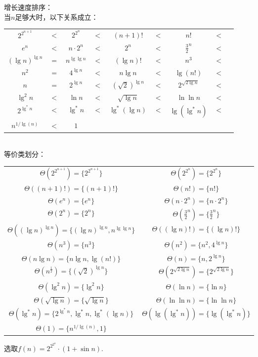 
\begin{solution}
    增长速度排序：\\
    当$n$足够大时，以下关系成立：\\
    \begin{tabular}{ccccccccc}
        $2^{2^{n+1}}$       &$<$& $2^{2^n}$         &$<$& $(n+1)!$              &$<$& $n!$                  &$<$\\
        $e^n$               &$<$& $n \cdot 2^n$     &$<$& $2^n$                 &$<$& $\frac{3}{2}^{n}$     &$<$\\
        $(\lg n)^{\lg n}$   &$=$& $n^{\lg\lg n}$    &$<$& $(\lg n)!$            &$<$& $n^3$                 &$<$\\
        $n^2$               &$=$& $4^{\lg n}$       &$<$& $n\lg n$              &$<$& $\lg (n!)$            &$<$\\
        $n$                 &$=$& $2^{\lg n}$       &$<$& $(\sqrt{2})^{\lg n}$  &$<$& $2^{\sqrt{2\lg n}}$   &$<$\\
        $\lg^2 n$           &$<$& $\ln n$           &$<$& $\sqrt{\lg n}$        &$<$& $\ln\ln n$            &$<$\\
        $2^{\lg^* n}$       &$<$& $\lg^* n$         &$<$& $\lg^*(\lg n)$        &$<$& $\lg(\lg^* n)$        &$<$\\         
        $n^{1/\lg(n)}$      &$<$& $1$
    \end{tabular}\\
    等价类划分：\\
    \begin{longtable}{cc}
    $\Theta(2^{2^{n+1}}) = \{2^{2^{n+1}}\}$ &
    $\Theta(2^{2^n}) = \{2^{2^n}\}$\\
    $\Theta((n+1)!) = \{(n+1)!\}$&
    $\Theta(n!) = \{n!\}$\\
    $\Theta(e^n) = \{e^n\}$&
    $\Theta(n \cdot 2^n) = \{n \cdot 2^n\}$\\
    $\Theta(2^n) = \{2^n\}$&
    $\Theta(\frac{3}{2}^{n}) = \{\frac{3}{2}^{n}\}$\\
    $\Theta((\lg n)^{\lg n}) = \{(\lg n)^{\lg n}, n^{\lg\lg n}\}$&
    $\Theta((\lg n)!) = \{(\lg n)!\}$\\

    $\Theta(n^3) = \{n^3\}$&
    $\Theta(n^2) = \{n^2, 4^{\lg n}\}$\\
    $\Theta(n\lg n) = \{n\lg n, \lg (n!)\}$&
    $\Theta(n) = \{n, 2^{\lg n}\}$\\
    $\Theta(n^{\frac{1}{2}}) = \{(\sqrt{2})^{\lg n}\}$&
    $\Theta(2^{\sqrt{2\lg n}}) = \{2^{\sqrt{2\lg n}}\}$\\

    $\Theta(\lg^2 n) = \{\lg^2 n\}$&
    $\Theta(\ln n) = \{\ln n\}$\\
    $\Theta(\sqrt{\lg n}) = \{\sqrt{\lg n}\}$&
    $\Theta(\ln\ln n) = \{\ln\ln n\}$\\

    $\Theta(\lg^* n) = \{2^{\lg^* n}, \lg^* n, \lg^*(\lg n)\}$&
    $\Theta(\lg(\lg^* n)) = \{\lg(\lg^* n)\}$\\
    $\Theta(1) = \{n^{1/\lg(n)}, 1\}$\\
    \end{longtable}
    选取$f(n) = 2^{2^{2^n}} \cdot (1+\sin n)$.
\end{solution}